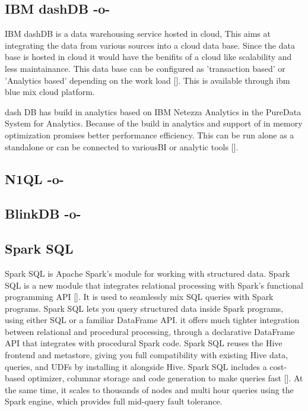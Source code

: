 \subsection{IBM dashDB -o-}

IBM dashDB is a data warehousing service hosted in cloud, This aims
at integrating the data from various sources into a cloud data
base. Since the data base is hosted in cloud it would have the
benifits of a cloud like scalability and less maintainance. This data
base can be configured as 'transaction based' or 'Analytics based'
depending on the work load [\cite{www-ibm-dash-db.com}]. This is
available through ibm blue mix cloud platform.

dash DB has build in analytics based on IBM Netezza Analytics in the
PureData System for Analytics. Because of the build in analytics and
support of in memory optimization promises better performance
efficiency.  This can be run alone as a standalone or can be connected
to variousBI or analytic tools [\cite{www-ibm-analytics.com}].


       
\subsection{N1QL -o-}



\subsection{BlinkDB -o-}



\subsection{Spark SQL}

Spark SQL is Apache Spark's module for working with structured
data. Spark SQL is a new module that integrates relational processing
with Spark's functional programming API [\cite{www-spark-sql}]. It is
used to seamlessly mix SQL queries with Spark programs. Spark SQL lets
you query structured data inside Spark programs, using either SQL or a
familiar DataFrame API.  it offers much tighter integration between
relational and procedural processing, through a declarative DataFrame
API that integrates with procedural Spark code.  Spark SQL reuses the
Hive frontend and metastore, giving you full compatibility with
existing Hive data, queries, and UDFs by installing it alongside
Hive. Spark SQL includes a cost-based optimizer, columnar storage and
code generation to make queries fast [\cite{www-spark-sql-2}]. At the
same time, it scales to thousands of nodes and multi hour queries
using the Spark engine, which provides full mid-query fault tolerance.

